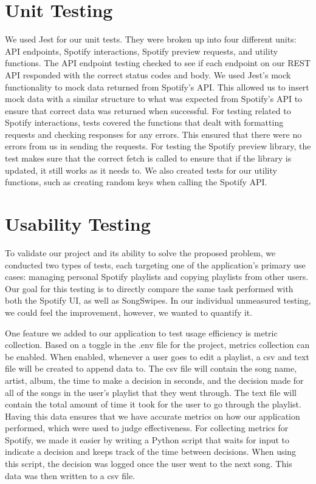 \documentclass{article}
\begin{document}
\section{Unit Testing}
\quad \quad We used Jest for our unit tests.  They were broken up into four different units: API endpoints, Spotify interactions, Spotify preview requests, and utility functions. The API endpoint testing checked to see if each endpoint on our REST API responded with the correct status codes and body. We used Jest's mock functionality to mock data returned from Spotify's API. This allowed us to insert mock data with a similar structure to what was expected from Spotify's API to ensure that correct data was returned when successful. For testing related to Spotify interactions, tests covered the functions that dealt with formatting requests and checking responses for any errors. This ensured that there were no errors from us in sending the requests. For testing the Spotify preview library, the test makes sure that the correct fetch is called to ensure that if the library is updated, it still works as it needs to. We also created tests for our utility functions, such as creating random keys when calling the Spotify API.

\section{Usability Testing}
\quad To validate our project and its ability to solve the proposed problem, we conducted two types of tests, each targeting one of the application's primary use cases: managing personal Spotify playlists and copying playlists from other users. Our goal for this testing is to directly compare the same task performed with both the Spotify UI, as well as SongSwipes. In our individual unmeasured testing, we could feel the improvement, however, we wanted to quantify it.

\quad One feature we added to our application to test usage efficiency is metric collection. Based on a toggle in the .env file for the project, metrics collection can be enabled. When enabled, whenever a user goes to edit a playlist, a csv and text file will be created to append data to. The csv file will contain the song name, artist, album, the time to make a decision in seconds, and the decision made for all of the songs in the user's playlist that they went through. The text file will contain the total amount of time it took for the user to go through the playlist. Having this data ensures that we have accurate metrics on how our application performed, which were used to judge effectiveness. For collecting metrics for Spotify, we made it easier by writing a Python script that waits for input to indicate a decision and keeps track of the time between decisions. When using this script, the decision was logged once the user went to the next song. This data was then written to a csv file. 
\end{document}
